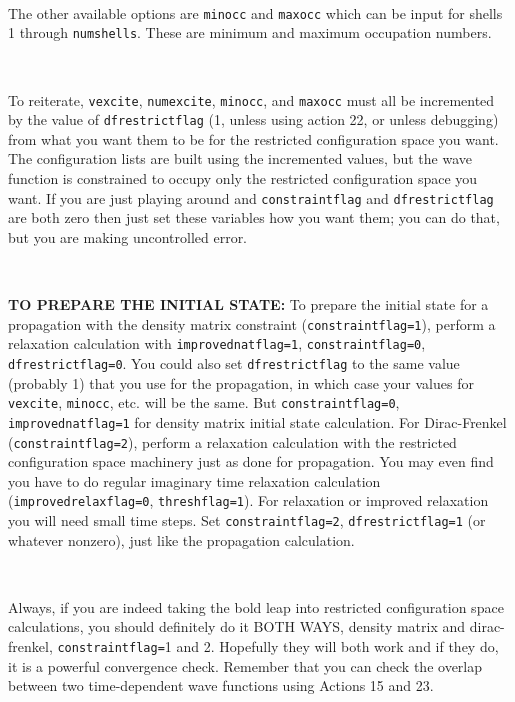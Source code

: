 \documentclass[10pt,leqno, oneside]{book}
\begin{document}
\

The other available options are \verb#minocc# and \verb#maxocc# which can be input for shells 1 through \verb#numshells#.
These are minimum and maximum occupation numbers.

\

To reiterate, \verb#vexcite#, \verb#numexcite#, \verb#minocc#, and \verb#maxocc# must all be incremented by the value of \verb#dfrestrictflag#
(1, unless using action 22, or unless debugging) from what you want them to be for the restricted configuration space you want. The configuration
lists are built using the incremented values, but the wave function is constrained to occupy only the restricted configuration space you want.
 If you are just
playing around and \verb#constraintflag# and \verb#dfrestrictflag# are both zero then just set these variables how you want them; you can do that,
but you are making uncontrolled error.

\

\textbf{TO PREPARE THE INITIAL STATE:}  To prepare the initial state for a propagation with the
density matrix constraint (\verb#constraintflag=1#), 
perform a relaxation calculation with \verb#improvednatflag=1#, \verb#constraintflag=0#, \verb#dfrestrictflag=0#.
You could also set \verb#dfrestrictflag# to the same value (probably 1) that you use for the propagation, in which case
your values for \verb#vexcite#, \verb#minocc#, etc. will be the same.  But \verb#constraintflag=0#, \verb#improvednatflag=1#
 for density matrix
initial state calculation.
  For Dirac-Frenkel (\verb#constraintflag=2#),
perform a relaxation calculation with the restricted configuration space machinery just as done for propagation.  You may even 
find you have to do regular imaginary time relaxation calculation (\verb#improvedrelaxflag=0#, \verb#threshflag=1#).  For relaxation
or improved relaxation you will need small time steps.  Set \verb#constraintflag=2#, \verb#dfrestrictflag=1# (or whatever nonzero),
just like the propagation calculation.

\

Always, if you are indeed taking the bold leap into restricted configuration space calculations, you should definitely do it BOTH WAYS,
density matrix and dirac-frenkel, \verb#constraintflag=#1 and 2.
Hopefully they will both work and if they do, it is a powerful convergence check.  Remember that 
you can check the overlap between two time-dependent wave functions
using Actions 15 and 23.
\end{document}
